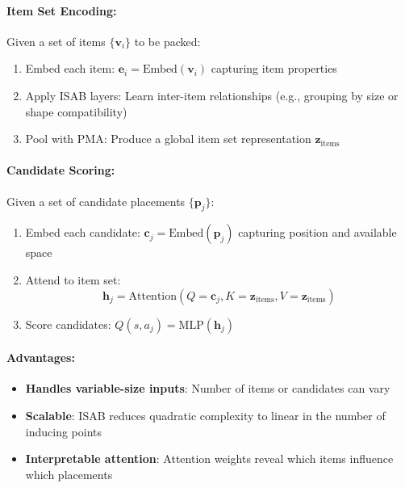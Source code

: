\paragraph{Item Set Encoding:} Given a set of items $\{\mathbf{v}_i\}$ to be packed:

\begin{enumerate}
\item Embed each item: $\mathbf{e}_i = \text{Embed}(\mathbf{v}_i)$ capturing item properties
\item Apply ISAB layers: Learn inter-item relationships (e.g., grouping by size or shape compatibility)
\item Pool with PMA: Produce a global item set representation $\mathbf{z}_{\text{items}}$
\end{enumerate}

\paragraph{Candidate Scoring:} Given a set of candidate placements $\{\mathbf{p}_j\}$:

\begin{enumerate}
\item Embed each candidate: $\mathbf{c}_j = \text{Embed}(\mathbf{p}_j)$ capturing position and available space
\item Attend to item set:
   \begin{equation}
   \mathbf{h}_j = \text{Attention}(Q=\mathbf{c}_j, K=\mathbf{z}_{\text{items}}, V=\mathbf{z}_{\text{items}})
   \end{equation}
\item Score candidates: $Q(s, a_j) = \text{MLP}(\mathbf{h}_j)$
\end{enumerate}

\paragraph{Advantages:}

\begin{itemize}
\item \textbf{Handles variable-size inputs}: Number of items or candidates can vary
\item \textbf{Scalable}: ISAB reduces quadratic complexity to linear in the number of inducing points
\item \textbf{Interpretable attention}: Attention weights reveal which items influence which placements
\end{itemize}

